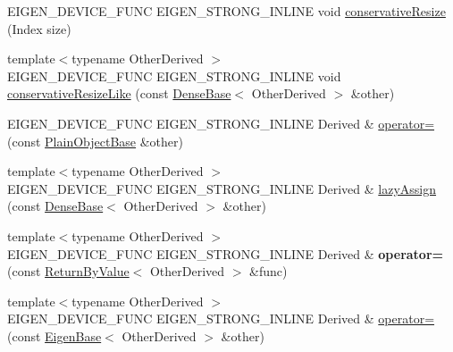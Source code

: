 \begin{DoxyCompactItemize}
\item 
E\+I\+G\+E\+N\+\_\+\+D\+E\+V\+I\+C\+E\+\_\+\+F\+U\+NC E\+I\+G\+E\+N\+\_\+\+S\+T\+R\+O\+N\+G\+\_\+\+I\+N\+L\+I\+NE void \mbox{\hyperlink{class_eigen_1_1_plain_object_base_a5429214e7c1ffaf7294a93a5cec62007}{conservative\+Resize}} (Index size)
\item 
{\footnotesize template$<$typename Other\+Derived $>$ }\\E\+I\+G\+E\+N\+\_\+\+D\+E\+V\+I\+C\+E\+\_\+\+F\+U\+NC E\+I\+G\+E\+N\+\_\+\+S\+T\+R\+O\+N\+G\+\_\+\+I\+N\+L\+I\+NE void \mbox{\hyperlink{class_eigen_1_1_plain_object_base_a7775d274035c4ef541aa0fc9a3ad30a2}{conservative\+Resize\+Like}} (const \mbox{\hyperlink{class_eigen_1_1_dense_base}{Dense\+Base}}$<$ Other\+Derived $>$ \&other)
\item 
E\+I\+G\+E\+N\+\_\+\+D\+E\+V\+I\+C\+E\+\_\+\+F\+U\+NC E\+I\+G\+E\+N\+\_\+\+S\+T\+R\+O\+N\+G\+\_\+\+I\+N\+L\+I\+NE Derived \& \mbox{\hyperlink{class_eigen_1_1_plain_object_base_a75308f8a23a03f045a1260611e2054a0}{operator=}} (const \mbox{\hyperlink{class_eigen_1_1_plain_object_base}{Plain\+Object\+Base}} \&other)
\item 
{\footnotesize template$<$typename Other\+Derived $>$ }\\E\+I\+G\+E\+N\+\_\+\+D\+E\+V\+I\+C\+E\+\_\+\+F\+U\+NC E\+I\+G\+E\+N\+\_\+\+S\+T\+R\+O\+N\+G\+\_\+\+I\+N\+L\+I\+NE Derived \& \mbox{\hyperlink{class_eigen_1_1_plain_object_base_a6008cee3b716d514b3e14c1bc7c0d34a}{lazy\+Assign}} (const \mbox{\hyperlink{class_eigen_1_1_dense_base}{Dense\+Base}}$<$ Other\+Derived $>$ \&other)
\item 
\mbox{\label{class_eigen_1_1_plain_object_base_a1682d60af2dd00c27507043aade71556}} 
{\footnotesize template$<$typename Other\+Derived $>$ }\\E\+I\+G\+E\+N\+\_\+\+D\+E\+V\+I\+C\+E\+\_\+\+F\+U\+NC E\+I\+G\+E\+N\+\_\+\+S\+T\+R\+O\+N\+G\+\_\+\+I\+N\+L\+I\+NE Derived \& {\bfseries operator=} (const \mbox{\hyperlink{class_eigen_1_1_return_by_value}{Return\+By\+Value}}$<$ Other\+Derived $>$ \&func)
\item 
{\footnotesize template$<$typename Other\+Derived $>$ }\\E\+I\+G\+E\+N\+\_\+\+D\+E\+V\+I\+C\+E\+\_\+\+F\+U\+NC E\+I\+G\+E\+N\+\_\+\+S\+T\+R\+O\+N\+G\+\_\+\+I\+N\+L\+I\+NE Derived \& \mbox{\hyperlink{class_eigen_1_1_plain_object_base_a6d280056e43429f043e8b25262ee6153}{operator=}} (const \mbox{\hyperlink{struct_eigen_1_1_eigen_base}{Eigen\+Base}}$<$ Other\+Derived $>$ \&other)

\end{DoxyCompactItemize}
